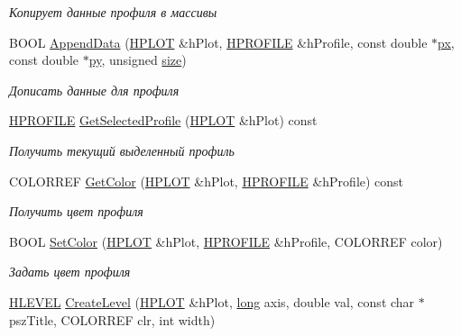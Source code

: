 \begin{DoxyCompactItemize}
\begin{DoxyCompactList}\small\item\em Копирует данные профиля в массивы \end{DoxyCompactList}\item 
B\-O\-O\-L \hyperlink{group__gr_output_data_ga21b8bd6024247b085e6c047ce4f6e763}{Append\-Data} (\hyperlink{classxyplot_1_1_h_p_l_o_t}{H\-P\-L\-O\-T} \&h\-Plot, \hyperlink{classxyplot_1_1_h_p_r_o_f_i_l_e}{H\-P\-R\-O\-F\-I\-L\-E} \&h\-Profile, const double $\ast$\hyperlink{namespacexyplot_aa88522a2f4371e38891cac7b5bc3e4aa}{px}, const double $\ast$\hyperlink{namespacexyplot_adc56454d6bac520db8907c6a206d3040}{py}, unsigned \hyperlink{namespacexyplot_a0e8516aaf446c174c28a4327a27dd9ce}{size})
\begin{DoxyCompactList}\small\item\em Дописать данные для профиля \end{DoxyCompactList}\item 
\hyperlink{classxyplot_1_1_h_p_r_o_f_i_l_e}{H\-P\-R\-O\-F\-I\-L\-E} \hyperlink{group__gr_prof_ex_ga3030074790ed5ddf22f2776226bd5442}{Get\-Selected\-Profile} (\hyperlink{classxyplot_1_1_h_p_l_o_t}{H\-P\-L\-O\-T} \&h\-Plot) const 
\begin{DoxyCompactList}\small\item\em Получить текущий выделенный профиль \end{DoxyCompactList}\item 
C\-O\-L\-O\-R\-R\-E\-F \hyperlink{group__gr_prof_ex_gaafda2be977c03f1a2a5e2a35d4117feb}{Get\-Color} (\hyperlink{classxyplot_1_1_h_p_l_o_t}{H\-P\-L\-O\-T} \&h\-Plot, \hyperlink{classxyplot_1_1_h_p_r_o_f_i_l_e}{H\-P\-R\-O\-F\-I\-L\-E} \&h\-Profile) const 
\begin{DoxyCompactList}\small\item\em Получить цвет профиля \end{DoxyCompactList}\item 
B\-O\-O\-L \hyperlink{group__gr_prof_ex_gadd75f7d7f166418aac31753a4a1bc59c}{Set\-Color} (\hyperlink{classxyplot_1_1_h_p_l_o_t}{H\-P\-L\-O\-T} \&h\-Plot, \hyperlink{classxyplot_1_1_h_p_r_o_f_i_l_e}{H\-P\-R\-O\-F\-I\-L\-E} \&h\-Profile, C\-O\-L\-O\-R\-R\-E\-F color)
\begin{DoxyCompactList}\small\item\em Задать цвет профиля \end{DoxyCompactList}\item 
\hyperlink{classxyplot_1_1_h_l_e_v_e_l}{H\-L\-E\-V\-E\-L} \hyperlink{group__gr_lvl_ex_gaf2ee73286c657c5cf07963143e74246d}{Create\-Level} (\hyperlink{classxyplot_1_1_h_p_l_o_t}{H\-P\-L\-O\-T} \&h\-Plot, \hyperlink{namespacexyplot_a27bc71b0bdfac09495e7e531d8a918c5}{long} axis, double val, const char $\ast$psz\-Title, C\-O\-L\-O\-R\-R\-E\-F clr, int width)

\end{DoxyCompactItemize}
